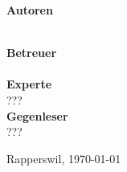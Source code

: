 \begin{titlepage}
\begin{minipage}{\linewidth}
	\end{minipage}
	\begin{minipage}{\linewidth}
	\begin{minipage}[t]{0.33\linewidth}
		\Large \textbf{Autoren} \\
		\Large \ubos \\
		\Large \pchr
	\end{minipage}
	\hfill\begin{minipage}[t]{0.5\linewidth}
		\Large \textbf{Betreuer} \\
		\Large \proff \\
		\textbf{\Large Experte}\\
		\Large ??? \\
		\textbf{\Large Gegenleser}\\
		\Large ???
	\end{minipage}
	\end{minipage}

	\begin{minipage}{0.33\linewidth}

	\end{minipage}
	\begin{minipage}{0.33\linewidth}


	\end{minipage}
	\begin{minipage}{0.33\linewidth}

	\end{minipage}
	\vfill
	\Large Rapperswil, \today

\end{titlepage}

\restoregeometry
